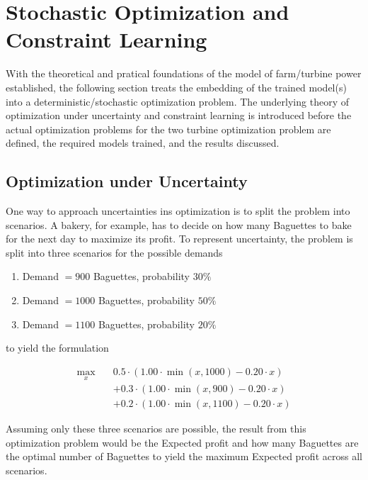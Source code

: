 \documentclass[preprint,12pt]{elsarticle}
\begin{document}
\section{Stochastic Optimization and Constraint Learning}\label{section:optimization}

With the theoretical and pratical foundations of the model of farm/turbine power established, the following section treats the embedding of the trained model(s)  into a deterministic/stochastic optimization problem. The underlying theory of optimization under uncertainty and constraint learning is introduced before the actual optimization problems for the two turbine optimization problem are defined, the required models trained, and the results discussed.


\subsection{Optimization under Uncertainty} \label{subsec:opti_under_uncertainty}

One way to approach uncertainties  ins optimization is to split the problem into scenarios. A bakery, for example, has to decide on how many Baguettes to bake for the next day to maximize its profit. To represent uncertainty, the problem is split into three scenarios for the possible demands

\begin{enumerate}
	\item Demand $= 900$ Baguettes, probability $30\%$ 
	\item Demand $= 1000$ Baguettes, probability $50\%$ 
	\item Demand $= 1100$ Baguettes, probability $20\%$ 
\end{enumerate}

to yield the formulation

\begin{align*}
	\max_{x} \quad & 0.5 \cdot \left(1.00 \cdot \min(x,1000) - 0.20 \cdot x \right) \\
	&+ 0.3 \cdot \left(1.00 \cdot \min(x,900) - 0.20 \cdot x\right) \\
	&+ 0.2 \cdot \left(1.00 \cdot \min(x,1100) - 0.20 \cdot x\right)
\end{align*}

Assuming only these three scenarios are possible, the result from this optimization problem would be the Expected profit and how many Baguettes are the optimal number of Baguettes to yield the maximum Expected profit across all scenarios. 
\end{document}
